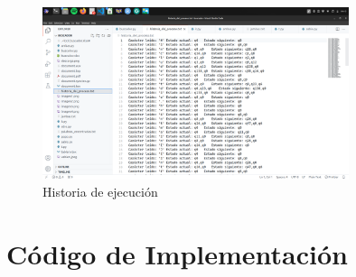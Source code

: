\documentclass[11pt]{article} %
\begin{document}
	\begin{figure}[H]
		\centering
		\includegraphics[width=0.8\textwidth]{imagen5}
		\caption{Historia de ejecución}
	\end{figure}
	

	
	
	\section{Código de Implementación}
	
\end{document}

